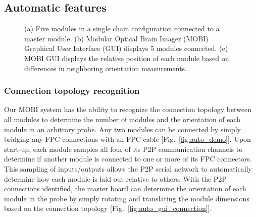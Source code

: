 \subsection{Automatic features}
\begin{figure}
    \begin{center}
    \end{center}
    \caption{(a) Five modules in a single chain configuration connected to a master module. (b) Modular Optical Brain Imager (MOBI) Graphical User Interface (GUI) displays 5 modules connected. (c) MOBI GUI displays the relative position of each module based on differences in neighboring orientation measurements.} 
    \label{fig:automatic}
\end{figure} 
\subsubsection{Connection topology recognition}
Our \ac{MOBI} system has the ability to recognize the connection topology between all modules to determine the number of modules and the orientation of each module in an arbitrary probe. Any two modules can be connected by simply bridging any \ac{FPC} connections with an \ac{FPC} cable [Fig.~\ref{fig:auto_demo}]. Upon start-up, each module samples all four of its \ac{P2P} communication channels to determine if another module is connected to one or more of its \ac{FPC} connectors. This sampling of inputs/outputs allows the \ac{P2P} serial network to automatically determine how each module is laid out relative to others. With the \ac{P2P} connections identified, the master board can determine the orientation of each module in the probe by simply rotating and translating the module dimensions based on the connection topology [Fig.~\ref{fig:auto_gui_connection}]. 

